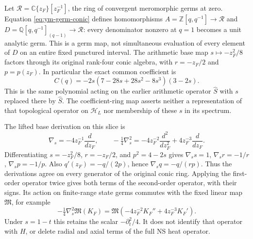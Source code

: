 Let $\mathcal R=\mathbb C\{z_F\}[z_F^{-1}]$, the ring of convergent
meromorphic germs at zero. Equation \eqref{eq:ym-germ-conic}
defines homomorphisms
$A=\mathbb Z[q,q^{-1}]\to\mathcal R$ and
$D=\mathbb Q[q,q^{-1}]_{(q-1)}\to\mathcal R$: every denominator
nonzero at $q=1$ becomes a unit analytic germ.
This is a germ map, not simultaneous evaluation of every element
of $D$ on an entire fixed punctured interval.
The arithmetic base map $s\mapsto-z_F^2/8$ factors through its
original rank-four conic algebra, with $r=-z_F/2$ and $p=p(z_F)$.
In particular the exact common coefficient is
\[
 C(q)=-2s(7-28s+28s^2-8s^3)(3-2s).
\]
This is the same polynomial acting on the earlier arithmetic
operator $\widehat S$ with $s$ replaced there by $\widehat S$.
The coefficient-ring map asserts neither a representation of
that topological operator on $\mathscr H_L$ nor membership of
these $s$ in its spectrum.

The lifted base derivation on this slice is
\[
 \nabla_s=-4z_F^{-1}\frac{d}{dz_F},\qquad
 -\tfrac14\nabla_s^2=-4z_F^{-2}\frac{d^2}{dz_F^2}
                         +4z_F^{-3}\frac{d}{dz_F}.
\]
Differentiating $s=-z_F^2/8$, $r=-z_F/2$, and $p^2=4-2s$
gives $\nabla_ss=1$, $\nabla_sr=-1/r$, $\nabla_sp=-1/p$.
Also $q'(z_F)=-q/(2p)$, hence $\nabla_sq=-q/(rp)$.
Thus the derivations agree on every generator of the original
conic ring. Applying the first-order operator twice gives both
terms of the second-order operator, with their signs.
Its action on finite-range state germs commutes with the fixed
linear map $\mathfrak M$, for example
\[
 -\tfrac14\nabla_s^2\mathfrak M(K_F)
 =\mathfrak M(-4z_F^{-2}K_F''+4z_F^{-3}K_F').
\]
Under $s=1-t$ this retains the scalar $-\partial_t^2/4$.
It does not identify that operator with $H$, or delete radial and
axial terms of the full NS heat operator.

